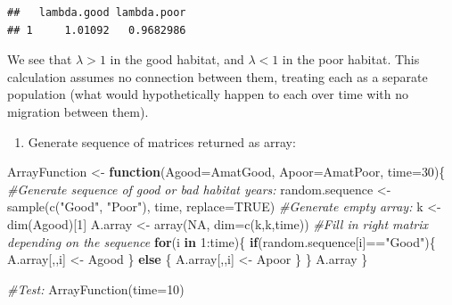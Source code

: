 \documentclass[
]{book}
\newenvironment{Shaded}{\begin{snugshade}}{\end{snugshade}}
\newcommand{\AttributeTok}[1]{\textcolor[rgb]{0.77,0.63,0.00}{#1}}
\newcommand{\CommentTok}[1]{\textcolor[rgb]{0.56,0.35,0.01}{\textit{#1}}}
\newcommand{\ConstantTok}[1]{\textcolor[rgb]{0.00,0.00,0.00}{#1}}
\newcommand{\ControlFlowTok}[1]{\textcolor[rgb]{0.13,0.29,0.53}{\textbf{#1}}}
\newcommand{\DecValTok}[1]{\textcolor[rgb]{0.00,0.00,0.81}{#1}}
\newcommand{\FunctionTok}[1]{\textcolor[rgb]{0.00,0.00,0.00}{#1}}
\newcommand{\NormalTok}[1]{#1}
\newcommand{\OtherTok}[1]{\textcolor[rgb]{0.56,0.35,0.01}{#1}}
\newcommand{\SpecialCharTok}[1]{\textcolor[rgb]{0.00,0.00,0.00}{#1}}
\newcommand{\StringTok}[1]{\textcolor[rgb]{0.31,0.60,0.02}{#1}}
\providecommand{\tightlist}{%
  \setlength{\itemsep}{0pt}\setlength{\parskip}{0pt}}
\begin{document}
\begin{verbatim}
##   lambda.good lambda.poor
## 1     1.01092   0.9682986
\end{verbatim}

We see that \(\lambda>1\) in the good habitat, and \(\lambda<1\) in the poor habitat. This calculation assumes no connection between them, treating each as a separate population (what would hypothetically happen to each over time with no migration between them).

\begin{enumerate}
\def\labelenumi{\arabic{enumi}.}
\setcounter{enumi}{1}
\tightlist
\item
  Generate sequence of matrices returned as array:
\end{enumerate}

\begin{Shaded}
\begin{Highlighting}[]
\NormalTok{ArrayFunction }\OtherTok{\textless{}{-}} \ControlFlowTok{function}\NormalTok{(}\AttributeTok{Agood=}\NormalTok{AmatGood, }\AttributeTok{Apoor=}\NormalTok{AmatPoor, }\AttributeTok{time=}\DecValTok{30}\NormalTok{)\{}
  \CommentTok{\#Generate sequence of good or bad habitat years:}
\NormalTok{  random.sequence }\OtherTok{\textless{}{-}} \FunctionTok{sample}\NormalTok{(}\FunctionTok{c}\NormalTok{(}\StringTok{"Good"}\NormalTok{, }\StringTok{"Poor"}\NormalTok{), time, }\AttributeTok{replace=}\ConstantTok{TRUE}\NormalTok{)}
  \CommentTok{\#Generate empty array:}
\NormalTok{  k }\OtherTok{\textless{}{-}} \FunctionTok{dim}\NormalTok{(Agood)[}\DecValTok{1}\NormalTok{]}
\NormalTok{  A.array }\OtherTok{\textless{}{-}} \FunctionTok{array}\NormalTok{(}\ConstantTok{NA}\NormalTok{, }\AttributeTok{dim=}\FunctionTok{c}\NormalTok{(k,k,time))}
  \CommentTok{\#Fill in right matrix depending on the sequence}
  \ControlFlowTok{for}\NormalTok{(i }\ControlFlowTok{in} \DecValTok{1}\SpecialCharTok{:}\NormalTok{time)\{}
    \ControlFlowTok{if}\NormalTok{(random.sequence[i]}\SpecialCharTok{==}\StringTok{"Good"}\NormalTok{)\{}
\NormalTok{      A.array[,,i] }\OtherTok{\textless{}{-}}\NormalTok{ Agood}
\NormalTok{    \}}
    \ControlFlowTok{else}\NormalTok{ \{}
\NormalTok{       A.array[,,i] }\OtherTok{\textless{}{-}}\NormalTok{ Apoor}
\NormalTok{    \}}
\NormalTok{  \}}
\NormalTok{  A.array}
\NormalTok{\}}

\CommentTok{\#Test:}
\FunctionTok{ArrayFunction}\NormalTok{(}\AttributeTok{time=}\DecValTok{10}\NormalTok{)}
\end{Highlighting}
\end{Shaded}
\end{document}
